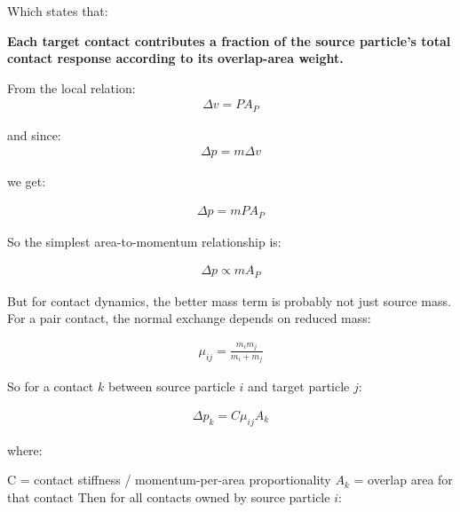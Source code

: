 Which states that:

\textbf{Each target contact contributes a fraction of the source particle's total contact response according to its overlap-area weight.}

From the local relation:
\begin{equation}
\begin{aligned}
\label{none}
\Delta v = P A_P
\end{aligned}
\end{equation}

and since:
\begin{equation}
\begin{aligned}
\label{none}
\Delta p = m \Delta v
\end{aligned}
\end{equation}

we get:


\begin{equation}
\begin{aligned}
\label{none}
\Delta p = m P A_P
\end{aligned}
\end{equation}

So the simplest area-to-momentum relationship is:

\begin{equation}
\begin{aligned}
\label{none}
\Delta p \propto m A_P
\end{aligned}
\end{equation}

But for contact dynamics, the better mass term is probably not just source mass. For a pair contact, the normal exchange depends on reduced mass:

\begin{equation}
\begin{aligned}
\label{none}
\mu_{ij} = \frac{m_i m_j}{m_i + m_j}
\end{aligned}
\end{equation}

So for a contact $k$ between source particle $i$ and target particle $j$:

\begin{equation}
\begin{aligned}
\label{none}
\Delta p_k = C \mu_{ij} A_k
\end{aligned}
\end{equation}

where:

C = contact stiffness / momentum-per-area proportionality
$A_k$ = overlap area for that contact
Then for all contacts owned by source particle $i$:

